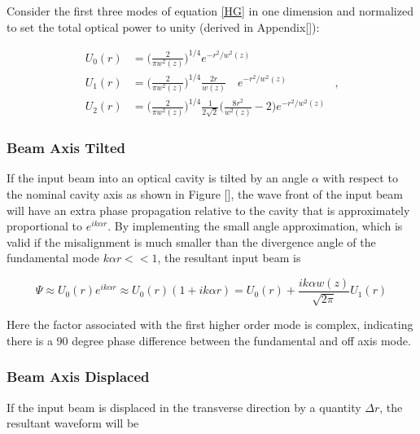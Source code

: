 \documentclass[oneside]{book}
\begin{document}
		Consider the first three modes of equation \ref{HG} in one dimension and normalized to set the total optical power to unity (derived in Appendix[]):

		\begin{equation}
		\label{Gauss1D}
		\begin{aligned}
				U_{0}(r) & =	\bigg( \frac{2}{\pi w^2(z)} \bigg)^{1/4}  e^{-r^2/w^2(z)}		&
		\\		U_{1}(r) &	=	\bigg( \frac{2}{\pi w^2(z)} \bigg)^{1/4}  \frac{2r}{w(z)} \quad e^{-r^2/w^2(z)}&,
		\\	 	U_{2}(r) &	=	\bigg( \frac{2}{\pi w^2(z)} \bigg)^{1/4}  \frac{1}{2\sqrt{2}} \bigg( \frac{8r^2}{w^2(z)} - 2 \bigg)   e^{-r^2/w^2(z)}
		\end{aligned}
		\end{equation}
				
		
		\subsubsection{Beam Axis Tilted}
		If the input beam into an optical cavity is tilted by an angle $\alpha$ with respect to the nominal cavity axis as shown in Figure [], the wave front of the input beam will have an extra phase propagation relative to the cavity that is approximately proportional to $e^{ik \alpha r}$.  By implementing the small angle approximation, which is valid if the misalignment is much smaller than the divergence angle of the fundamental mode $k \alpha r << 1$, the resultant input beam is
		
		\begin{equation}
		\Psi \approx U_{0}(r) e^{ik \alpha r} \approx U_{0}(r) ( 1 + ik \alpha r ) =  U_{0}(r) + \frac{ik \alpha w(z)}{\sqrt{2\pi}} U_{1}(r)
		\end{equation}
		
		Here the factor associated with the first higher order mode is complex, indicating there is a 90 degree phase difference between the fundamental and off axis mode. 
		\subsubsection{Beam Axis Displaced}
		If the input beam is displaced in the transverse direction by a quantity $\Delta r$, the resultant waveform will be
		
\end{document}
